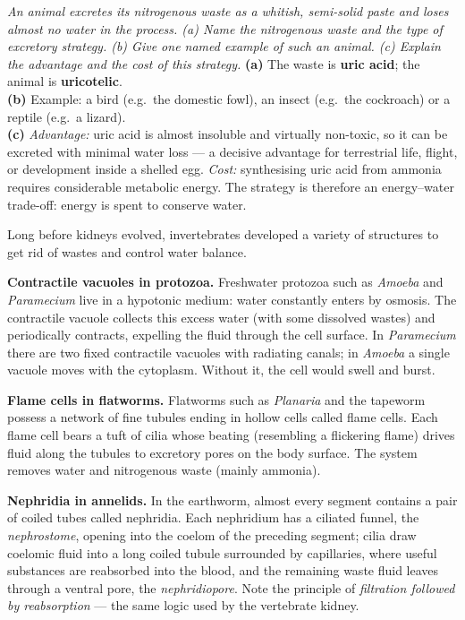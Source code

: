 \documentclass[11pt]{article}
\newcommand{\cle}[1]{{\popxbold\color{popdark}#1}}
\newcounter{popsec}
\newcounter{popsub}
\newcommand{\courssub}[1]{%
  \stepcounter{popsub}%
  \par\vspace{9pt}\noindent{\popxbold\fontsize{11.5}{13}\selectfont\color{popink}{\color{poporange}\thepopsec.\thepopsub}\hspace{6pt}#1}\par\nopagebreak\vspace{4pt}
}
\begin{document}
\begin{exoresolu}
\textit{An animal excretes its nitrogenous waste as a whitish, semi-solid paste and loses almost no water in the process. (a) Name the nitrogenous waste and the type of excretory strategy. (b) Give one named example of such an animal. (c) Explain the advantage and the cost of this strategy.}
\tcblower
\textbf{(a)} The waste is \textbf{uric acid}; the animal is \textbf{uricotelic}.\\
\textbf{(b)} Example: a bird (e.g.\ the domestic fowl), an insect (e.g.\ the cockroach) or a reptile (e.g.\ a lizard).\\
\textbf{(c)} \emph{Advantage:} uric acid is almost insoluble and virtually non-toxic, so it can be excreted with minimal water loss — a decisive advantage for terrestrial life, flight, or development inside a shelled egg. \emph{Cost:} synthesising uric acid from ammonia requires considerable metabolic energy. The strategy is therefore an energy--water trade-off: energy is spent to conserve water.
\end{exoresolu}

\courssub{Excretory Structures in Invertebrates}

Long before kidneys evolved, invertebrates developed a variety of structures to get rid of wastes and control water balance.

\textbf{Contractile vacuoles in protozoa.} Freshwater protozoa such as \emph{Amoeba} and \emph{Paramecium} live in a hypotonic medium: water constantly enters by osmosis. The \cle{contractile vacuole} collects this excess water (with some dissolved wastes) and periodically contracts, expelling the fluid through the cell surface. In \emph{Paramecium} there are two fixed contractile vacuoles with radiating canals; in \emph{Amoeba} a single vacuole moves with the cytoplasm. Without it, the cell would swell and burst.

\textbf{Flame cells in flatworms.} Flatworms such as \emph{Planaria} and the tapeworm possess a network of fine tubules ending in hollow cells called \cle{flame cells}. Each flame cell bears a tuft of cilia whose beating (resembling a flickering flame) drives fluid along the tubules to excretory pores on the body surface. The system removes water and nitrogenous waste (mainly ammonia).

\textbf{Nephridia in annelids.} In the earthworm, almost every segment contains a pair of coiled tubes called \cle{nephridia}. Each nephridium has a ciliated funnel, the \emph{nephrostome}, opening into the coelom of the preceding segment; cilia draw coelomic fluid into a long coiled tubule surrounded by capillaries, where useful substances are reabsorbed into the blood, and the remaining waste fluid leaves through a ventral pore, the \emph{nephridiopore}. Note the principle of \emph{filtration followed by reabsorption} — the same logic used by the vertebrate kidney.
\end{document}
